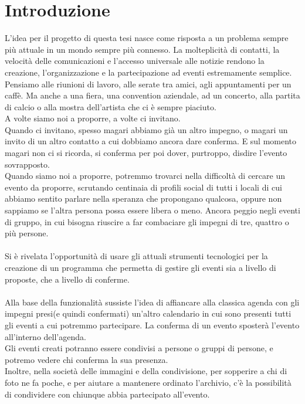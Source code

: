 \section{Introduzione}

L'idea per il progetto di questa tesi nasce come risposta a un problema sempre più attuale in un mondo sempre più connesso.
La molteplicità di contatti, la velocità delle comunicazioni e l'accesso universale alle notizie 
rendono la creazione, l'organizzazione e la partecipazione ad eventi estremamente semplice.
Pensiamo alle riunioni di lavoro, alle serate tra amici, agli appuntamenti per un caffè.
Ma anche a una fiera, una convention aziendale, ad un concerto, alla partita di calcio o alla mostra dell'artista che ci è sempre piaciuto.\\
\hfill \break
A volte siamo noi a proporre, a volte ci invitano. \\
Quando ci invitano, spesso magari abbiamo già un altro impegno, o magari un invito di un altro contatto a cui dobbiamo ancora dare conferma. 
E sul momento magari non ci si ricorda, si conferma per poi dover, purtroppo, disdire l'evento sovrapposto.\\
Quando siamo noi a proporre, potremmo trovarci nella difficoltà di cercare un evento da proporre, 
scrutando centinaia di profili social di tutti i locali di cui abbiamo sentito parlare nella speranza che propongano qualcosa, 
oppure non sappiamo se l'altra persona possa essere libera o meno. Ancora peggio negli eventi di gruppo, in cui bisogna riuscire a far combaciare gli impegni di tre, quattro o più persone.\\
\\
Si è rivelata l'opportunità di usare gli attuali strumenti tecnologici per la creazione di un programma che permetta 
di gestire gli eventi sia a livello di proposte, che a livello di conferme.\\
\\
Alla base della funzionalità sussiste l'idea di affiancare alla classica agenda con gli impegni presi(e quindi confermati) 
un'altro calendario in cui sono presenti tutti gli eventi a cui potremmo partecipare. La conferma di un evento sposterà l'evento all'interno dell'agenda.\\
Gli eventi creati potranno essere condivisi a persone o gruppi di persone, e potremo vedere chi conferma la sua presenza.\\
Inoltre, nella società delle immagini e della condivisione, per sopperire a chi di foto ne fa poche, e per aiutare a mantenere ordinato l'archivio, c'è la possibilità di condividere con chiunque abbia partecipato all'evento.\\
